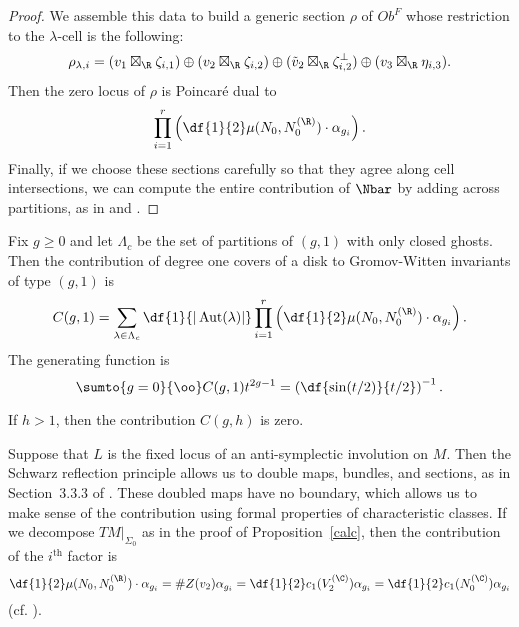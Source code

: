 \begin{proposition}
\begin{proof}
We assemble this data to build a generic section $\rho$ of $Ob^F$ whose restriction to the $\lambda$-cell is the following:
\[
\rho_{\lambda,i} = (v_1 \boxtimes_\R \zeta_{i,1}) \oplus (v_2 \boxtimes_\R \zeta_{i,2}) \oplus (\tilde{v}_2 \boxtimes_\R \zeta_{i,2}^\perp) \oplus (v_3 \boxtimes_\R \eta_{i,3}).
\]
Then the zero locus of $\rho$ is Poincar\'{e} dual to 
\[
\prod\limits_{i=1}^r \left( \df{1}{2}\mu(N_0,N_0^{(\R)}) \cdot \alpha_{g_i} \right).
\]
Finally, if we choose these sections carefully so that they agree along cell intersections, we can compute the entire contribution of $\Nbar$ by adding across partitions, as in \cite{pand} and \cite{niuZinger}.
\end{proof}
\end{proposition}

\begin{corollary} \label{perm}
Fix $g \geq 0$ and let $\Lambda_{c}$ be the set of partitions of $(g,1)$ with only closed ghosts. Then the contribution of degree one covers of a disk to Gromov-Witten invariants of type $(g,1)$ is
\[
C(g,1) = \sum\limits_{\lambda \in \Lambda_c} \df{1}{|\Aut(\lambda)|} \prod\limits_{i=1}^r \left( \df{1}{2}\mu(N_0,N_0^{(\R)}) \cdot \alpha_{g_i} \right).
\]
The generating function is
\[
\sumto{g=0}{\oo} C(g,1)t^{2g-1} = \left( \df{\sin(t/2)}{t/2} \right)^{-1}.
\]
\end{corollary}

\begin{corollary} \label{zero}
If $h>1$, then the contribution $C(g,h)$ is zero.
\end{corollary}

\begin{remark} \label{doubleCt}
Suppose that $L$ is the fixed locus of an anti-symplectic involution on $M$.  Then the Schwarz reflection principle allows us to double maps, bundles, and sections, as in Section~3.3.3 of \cite{katzLiu}. These doubled maps have no boundary, which allows us to make sense of the contribution using formal properties of characteristic classes. If we decompose $TM|_{\Sigma_0}$ as in the proof of Proposition~\ref{calc}, then the contribution of the $i^{\text{th}}$ factor is
\[
\df{1}{2}\mu(N_0,N_0^{(\R)}) \cdot \alpha_{g_i} = \#Z(v_2)\alpha_{g_i} = \df{1}{2}c_1(V_2^{(\C)})\alpha_{g_i} = \df{1}{2}c_1(N_0^{(\C)})\alpha_{g_i}
\]
(cf. \cite{niuZinger}).
\end{remark}
